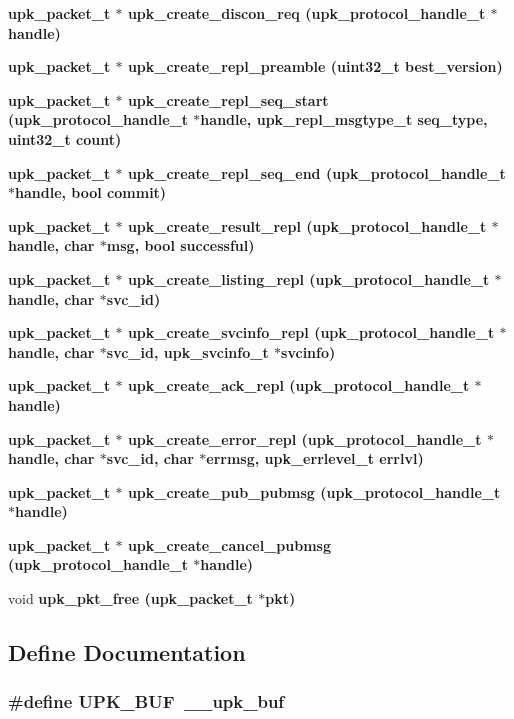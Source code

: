 \begin{CompactItemize}
\bf{upk\_\-packet\_\-t} $\ast$ \bf{upk\_\-create\_\-discon\_\-req} (\bf{upk\_\-protocol\_\-handle\_\-t} $\ast$handle)
\item 
\bf{upk\_\-packet\_\-t} $\ast$ \bf{upk\_\-create\_\-repl\_\-preamble} (uint32\_\-t best\_\-version)
\item 
\bf{upk\_\-packet\_\-t} $\ast$ \bf{upk\_\-create\_\-repl\_\-seq\_\-start} (\bf{upk\_\-protocol\_\-handle\_\-t} $\ast$handle, \bf{upk\_\-repl\_\-msgtype\_\-t} seq\_\-type, uint32\_\-t count)
\item 
\bf{upk\_\-packet\_\-t} $\ast$ \bf{upk\_\-create\_\-repl\_\-seq\_\-end} (\bf{upk\_\-protocol\_\-handle\_\-t} $\ast$handle, bool commit)
\item 
\bf{upk\_\-packet\_\-t} $\ast$ \bf{upk\_\-create\_\-result\_\-repl} (\bf{upk\_\-protocol\_\-handle\_\-t} $\ast$handle, char $\ast$msg, bool successful)
\item 
\bf{upk\_\-packet\_\-t} $\ast$ \bf{upk\_\-create\_\-listing\_\-repl} (\bf{upk\_\-protocol\_\-handle\_\-t} $\ast$handle, char $\ast$svc\_\-id)
\item 
\bf{upk\_\-packet\_\-t} $\ast$ \bf{upk\_\-create\_\-svcinfo\_\-repl} (\bf{upk\_\-protocol\_\-handle\_\-t} $\ast$handle, char $\ast$svc\_\-id, \bf{upk\_\-svcinfo\_\-t} $\ast$svcinfo)
\item 
\bf{upk\_\-packet\_\-t} $\ast$ \bf{upk\_\-create\_\-ack\_\-repl} (\bf{upk\_\-protocol\_\-handle\_\-t} $\ast$handle)
\item 
\bf{upk\_\-packet\_\-t} $\ast$ \bf{upk\_\-create\_\-error\_\-repl} (\bf{upk\_\-protocol\_\-handle\_\-t} $\ast$handle, char $\ast$svc\_\-id, char $\ast$errmsg, \bf{upk\_\-errlevel\_\-t} errlvl)
\item 
\bf{upk\_\-packet\_\-t} $\ast$ \bf{upk\_\-create\_\-pub\_\-pubmsg} (\bf{upk\_\-protocol\_\-handle\_\-t} $\ast$handle)
\item 
\bf{upk\_\-packet\_\-t} $\ast$ \bf{upk\_\-create\_\-cancel\_\-pubmsg} (\bf{upk\_\-protocol\_\-handle\_\-t} $\ast$handle)
\item 
void \bf{upk\_\-pkt\_\-free} (\bf{upk\_\-packet\_\-t} $\ast$pkt)
\end{CompactItemize}


\subsection{Define Documentation}
\subsubsection{\setlength{\rightskip}{0pt plus 5cm}\#define UPK\_\-BUF~\_\-\_\-upk\_\-buf}\label{protocol_8h_e1d1e2f91d6faf59c3e3b422cf816da2}


